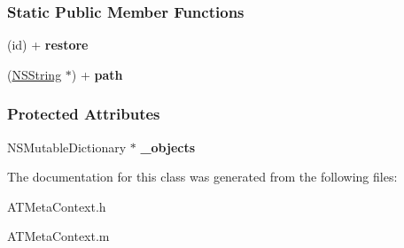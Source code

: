 \subsubsection*{Static Public Member Functions}
\begin{DoxyCompactItemize}
\item 
\hypertarget{interface_a_t_meta_context_a5ea6f84cd61278e7a69a5e466acb5ef6}{
(id) + {\bfseries restore}}
\label{interface_a_t_meta_context_a5ea6f84cd61278e7a69a5e466acb5ef6}

\item 
\hypertarget{interface_a_t_meta_context_aa958a238c2f8e661d92410aaa365af25}{
(\hyperlink{class_n_s_string}{NSString} $\ast$) + {\bfseries path}}
\label{interface_a_t_meta_context_aa958a238c2f8e661d92410aaa365af25}

\end{DoxyCompactItemize}
\subsubsection*{Protected Attributes}
\begin{DoxyCompactItemize}
\item 
\hypertarget{interface_a_t_meta_context_aa7bba9acdaedcefd8aeb096a36181a94}{
NSMutableDictionary $\ast$ {\bfseries \_\-objects}}
\label{interface_a_t_meta_context_aa7bba9acdaedcefd8aeb096a36181a94}

\end{DoxyCompactItemize}


The documentation for this class was generated from the following files:\begin{DoxyCompactItemize}
\item 
ATMetaContext.h\item 
ATMetaContext.m\end{DoxyCompactItemize}
